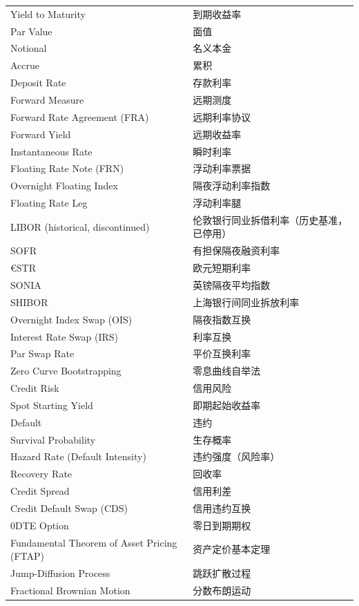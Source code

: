 \begin{longtable}{ll}
    Yield to Maturity & 到期收益率 \\
    Par Value & 面值 \\
    Notional & 名义本金 \\
    Accrue & 累积 \\
    Deposit Rate & 存款利率 \\
    Forward Measure & 远期测度 \\
    Forward Rate Agreement (FRA) & 远期利率协议 \\
    Forward Yield & 远期收益率 \\
    Instantaneous Rate & 瞬时利率 \\
    Floating Rate Note (FRN) & 浮动利率票据 \\
    Overnight Floating Index & 隔夜浮动利率指数 \\
    Floating Rate Leg & 浮动利率腿 \\
    LIBOR (historical, discontinued) & 伦敦银行同业拆借利率（历史基准，已停用） \\
    SOFR & 有担保隔夜融资利率 \\
    €STR & 欧元短期利率 \\
    SONIA & 英镑隔夜平均指数 \\
    SHIBOR & 上海银行间同业拆放利率 \\
    Overnight Index Swap (OIS) & 隔夜指数互换 \\
    Interest Rate Swap (IRS) & 利率互换 \\
    Par Swap Rate & 平价互换利率 \\
    Zero Curve Bootstrapping & 零息曲线自举法 \\
    Credit Risk & 信用风险 \\
    Spot Starting Yield & 即期起始收益率 \\
    Default & 违约 \\
    Survival Probability & 生存概率 \\
    Hazard Rate (Default Intensity) & 违约强度（风险率） \\
    Recovery Rate & 回收率 \\
    Credit Spread & 信用利差 \\
    Credit Default Swap (CDS) & 信用违约互换 \\
    0DTE Option & 零日到期期权 \\
    Fundamental Theorem of Asset Pricing (FTAP) & 资产定价基本定理 \\
    Jump-Diffusion Process & 跳跃扩散过程 \\
    Fractional Brownian Motion & 分数布朗运动 \\

\end{longtable}
